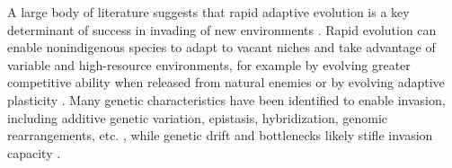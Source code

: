 \documentclass[12pt]{article}\usepackage[]{graphicx}\usepackage[]{color}
\begin{document}
	
	A large body of literature suggests that rapid adaptive evolution is a key determinant of success in invading of new environments \parencite{Sakai2001,Reznick2001, Lambrinos2004,Williamson1997,Thompson1998, Cox2004, Prentis2008,Colautti2015,Lee2002invasion, Fenollosa2019,Clements2011}.  Rapid evolution can enable nonindigenous species to adapt to vacant niches and take advantage of variable and high-resource environments, for example by evolving greater competitive ability  when released from natural enemies \parencite{Blossey1995,Bossdorf2005} or by evolving adaptive plasticity \parencite{Richards2006}. Many genetic characteristics have been identified to enable invasion, including additive genetic variation, epistasis, hybridization, genomic rearrangements, etc. \parencite[Reviewed in][]{Lee2002invasion}, while genetic drift and bottlenecks likely stifle invasion capacity \parencite{Bock2015}. 
	
\end{document}

